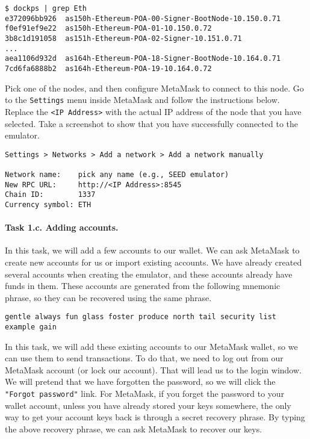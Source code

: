 \begin{lstlisting}
$ dockps | grep Eth
e372096bb926  as150h-Ethereum-POA-00-Signer-BootNode-10.150.0.71
f0ef91ef9e22  as150h-Ethereum-POA-01-10.150.0.72
3b8c1d191058  as151h-Ethereum-POA-02-Signer-10.151.0.71
...
aea1106d932d  as164h-Ethereum-POA-18-Signer-BootNode-10.164.0.71
7cd6fa6888b2  as164h-Ethereum-POA-19-10.164.0.72
\end{lstlisting}
 

Pick one of the nodes, and then configure MetaMask to connect to
this node. Go to the \texttt{Settings} menu inside MetaMask
and follow the instructions below. Replace 
the \texttt{<IP Address>} with the actual IP address of the 
node that you have selected. Take a screenshot to show that 
you have successfully connected to the emulator. 

\begin{lstlisting}
Settings > Networks > Add a network > Add a network manually

Network name:    pick any name (e.g., SEED emulator)
New RPC URL:     http://<IP Address>:8545 
Chain ID:        1337
Currency symbol: ETH
\end{lstlisting}



\paragraph{Task 1.c. Adding accounts.} 
In this task, we will add a few accounts to our wallet. We can ask
MetaMask to create new accounts for us or import existing 
accounts. We have already created several accounts when creating the 
emulator, and these accounts already have funds in them. 
These accounts are generated from the following mnemonic phrase,
so they can be recovered using the same phrase. 

\begin{lstlisting}
gentle always fun glass foster produce north tail security list example gain
\end{lstlisting}

In this task, we will add these existing accounts to our 
MetaMask wallet, so we can use them to send transactions. 
To do that, we need to log out from our MetaMask account (or lock our 
account). That will lead us to the login window. We will pretend 
that we have forgotten the password, so we will click the 
\texttt{"Forgot password"} link. 
For MetaMask, if you forget the password to your wallet account, 
unless you have 
already stored your keys somewhere, the only way to get your account
keys back is through a secret recovery phrase. 
By typing the above recovery phrase, we can ask MetaMask to recover
our keys. 

